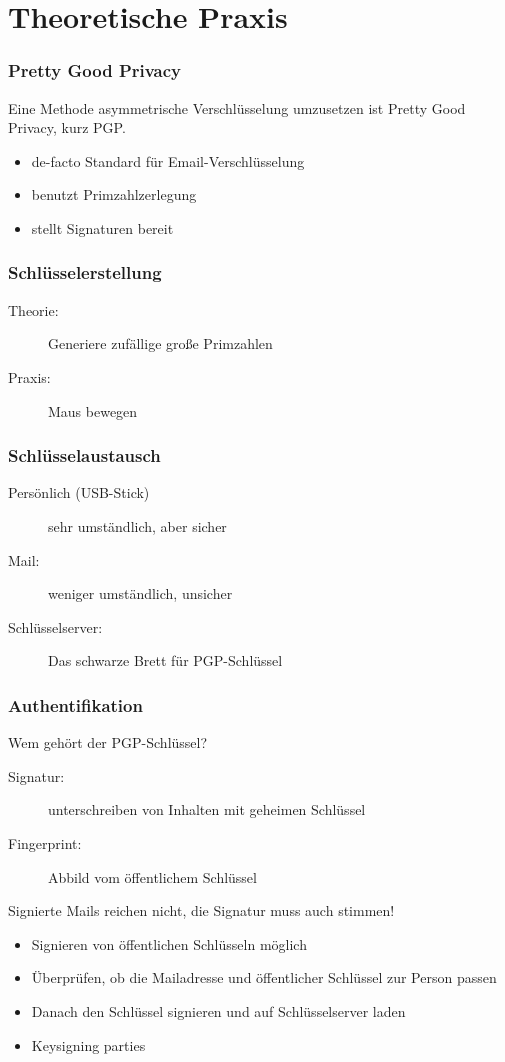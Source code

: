 \documentclass[compress]{beamer}
\begin{document}
\section{Theoretische Praxis}
\label{sec-1-1-4}

\begin{frame}
    \frametitle{Pretty Good Privacy}
    Eine Methode asymmetrische Verschlüsselung umzusetzen ist
    \alert{P}retty \alert{G}ood \alert{P}rivacy, kurz PGP.
    \begin{itemize}
        \item de-facto Standard für Email-Verschlüsselung
        \item benutzt Primzahlzerlegung
        \item stellt Signaturen bereit
    \end{itemize}
\end{frame}
\begin{frame}
    \frametitle{Schlüsselerstellung}
    \begin{description}
        \item[Theorie:] Generiere zufällige große Primzahlen
        \item[Praxis:] Maus bewegen
    \end{description}
\end{frame}
\begin{frame}
    \frametitle{Schlüsselaustausch}
    \begin{description}
        \item[Persönlich (USB-Stick)] sehr umständlich, aber sicher
        \item[Mail:] weniger umständlich, unsicher
        \item[Schlüsselserver:] Das schwarze Brett für PGP-Schlüssel
    \end{description}
\end{frame}
\begin{frame}
    \frametitle{Authentifikation}
    Wem gehört der PGP-Schlüssel?
    \begin{description}
        \item[Signatur:] unterschreiben von Inhalten mit geheimen Schlüssel
        \item[Fingerprint:] Abbild vom öffentlichem Schlüssel
    \end{description}
    Signierte Mails reichen nicht, die Signatur muss auch stimmen!
    \begin{itemize}
        \item Signieren von öffentlichen Schlüsseln möglich
        \item Überprüfen, ob die Mailadresse und öffentlicher Schlüssel zur Person passen
        \item Danach den Schlüssel signieren und auf Schlüsselserver laden
        \item Keysigning parties
    \end{itemize}
\end{frame}
\end{document}
